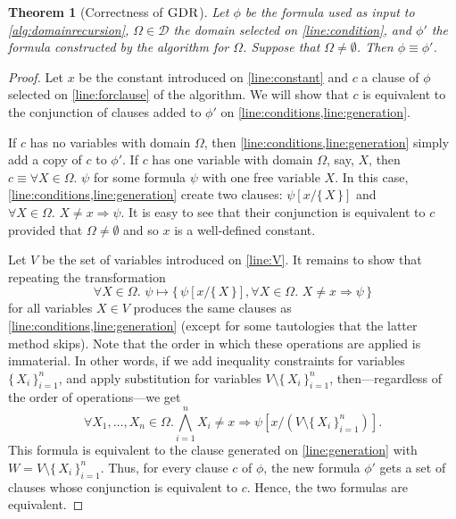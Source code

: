 \documentclass{article}
\newtheorem{theorem}{Theorem}
\DeclareMathOperator{\GDR}{\textsc{GDR}}
\begin{document}
\begin{theorem}[Correctness of $\GDR$]
  Let $\phi$ be the formula used as input to \cref{alg:domainrecursion},
  $\Omega \in \mathcal{D}$ the domain selected on \cref{line:condition}, and
  $\phi'$ the formula constructed by the algorithm for $\Omega$. Suppose that
  $\Omega \ne \emptyset$. Then $\phi \equiv \phi'$.
\end{theorem}
\begin{proof}
  Let $x$ be the constant introduced on \cref{line:constant} and $c$ a clause of
  $\phi$ selected on \cref{line:forclause} of the algorithm. We will show that
  $c$ is equivalent to the conjunction of clauses added to $\phi'$ on
  \cref{line:conditions,line:generation}.

  If $c$ has no variables with domain $\Omega$, then
  \cref{line:conditions,line:generation} simply add a copy of $c$ to $\phi'$. If
  $c$ has one variable with domain $\Omega$, say, $X$, then
  $c \equiv \forall X \in \Omega\text{. } \psi$ for some formula $\psi$ with one
  free variable $X$. In this case, \cref{line:conditions,line:generation} create
  two clauses: $\psi[x/\{\, X \,\}]$ and $\forall X \in \Omega\text{.
  } X \ne x \Rightarrow \psi$. It is easy to see that their conjunction is
  equivalent to $c$ provided that $\Omega \ne \emptyset$ and so $x$ is a
  well-defined constant.

  Let $V$ be the set of variables introduced on \cref{line:V}. It remains to
  show that repeating the transformation
  \[
    \forall X \in \Omega\text{. } \psi \mapsto \{\, \psi[x/\{\, X \,\}], \forall X \in \Omega\text{. } X \ne x \Rightarrow \psi \,\}
  \]
  for all variables $X \in V$ produces the same clauses as
  \cref{line:conditions,line:generation} (except for some tautologies that the
  latter method skips). Note that the order in which these operations are
  applied is immaterial. In other words, if we add inequality constraints for
  variables ${\{\, X_{i} \,\}}_{i=1}^{n}$, and apply substitution for variables
  $V \setminus {\{\, X_{i} \,\}}_{i=1}^{n}$, then---regardless of the order of
  operations---we get
  \[
    \forall X_{1}, \dots, X_{n} \in \Omega\text{.} \bigwedge_{i=1}^{n} X_{i} \ne x \Rightarrow \psi\left[x / \left(V \setminus {\{\, X_{i} \,\}}_{i=1}^{n}\right)\right].
  \]
  This formula is equivalent to the clause generated on \cref{line:generation}
  with $W = V \setminus {\{\, X_{i} \,\}}_{i=1}^{n}$. Thus, for every clause $c$
  of $\phi$, the new formula $\phi'$ gets a set of clauses whose conjunction is
  equivalent to $c$. Hence, the two formulas are equivalent.
\end{proof}
\end{document}
